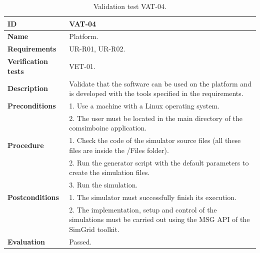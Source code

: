 \begin{center}
\begin{table}[htb]
\centering
\begin{tabular}{@{}p{2.5cm} p{13cm}@{}} 
\toprule
\textbf{ID} 					& VAT-04 \\
\midrule
\textbf{Name} 				& Platform. \\
\midrule
\textbf{Requirements} 		& UR-R01, UR-R02. \\
\midrule
\textbf{Verification tests} 	& VET-01. \\
\midrule
\textbf{Description} 		& Validate that the software can be used on the platform and is developed with the tools specified in the requirements. \\
\midrule
\textbf{Preconditions}		& 1. Use a machine with a Linux operating system. \\
							& 2. The user must be located in the main directory of the \gls{comsimboinc} application. \\
\midrule
\textbf{Procedure}			& 1. Check the code of the simulator source files (all these files are inside the /Files folder). \\
							& 2. Run the generator script with the default parameters to create the simulation files. \\
							& 3. Run the simulation. \\ 
\midrule
\textbf{Postconditions} 		& 1. The simulator must successfully finish its execution. \\
							& 2. The implementation, setup and control of the simulations must be carried out using the MSG API of the SimGrid toolkit. \\
\midrule
\textbf{Evaluation} 			& Passed. \\
\bottomrule
\end{tabular}
\caption{Validation test VAT-04.}
\label{tab:vat-04}
\end{table}
\end{center}

\clearpage


